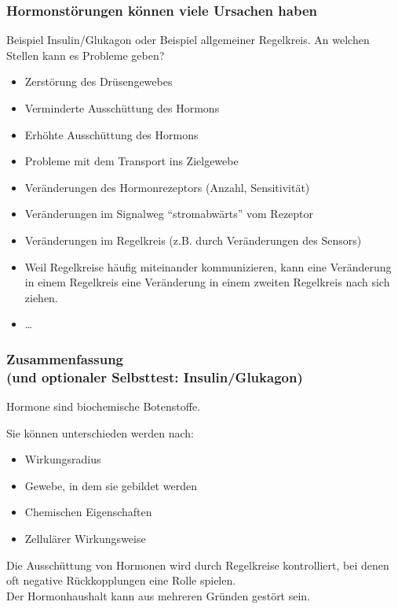 \documentclass{beamer}
\begin{document}
\begin{frame}
\frametitle{Hormonstörungen können viele Ursachen haben}

Beispiel Insulin/Glukagon oder Beispiel allgemeiner Regelkreis. An welchen Stellen kann es Probleme geben?

\pause

\begin{itemize}
\item
Zerstörung des Drüsengewebes
\item
Verminderte Ausschüttung des Hormons
\item
Erhöhte Ausschüttung des Hormons
\item
Probleme mit dem Transport ins Zielgewebe
\item
Veränderungen des Hormonrezeptors (Anzahl, Sensitivität)
\item
Veränderungen im Signalweg ``stromabwärts'' vom Rezeptor
\item
Veränderungen im Regelkreis (z.B. durch Veränderungen des Sensors)
\item
Weil Regelkreise häufig miteinander kommunizieren, kann eine Veränderung in einem Regelkreis eine Veränderung in einem zweiten Regelkreis nach sich ziehen.
\item
\dots

\end{itemize}

\end{frame}




\begin{frame}
\frametitle{Zusammenfassung \\ (und optionaler Selbsttest: Insulin/Glukagon)}

Hormone sind biochemische Botenstoffe. 

Sie können unterschieden werden nach:

\begin{itemize}
\item
Wirkungsradius
\item
Gewebe, in dem sie gebildet werden
\item
Chemischen Eigenschaften
\item
Zellulärer Wirkungsweise
\end{itemize}

Die Ausschüttung von Hormonen wird durch Regelkreise kontrolliert, bei denen oft negative Rückkopplungen eine Rolle spielen. \\

Der Hormonhaushalt kann aus mehreren Gründen gestört sein.

\end{frame}
\end{document}
